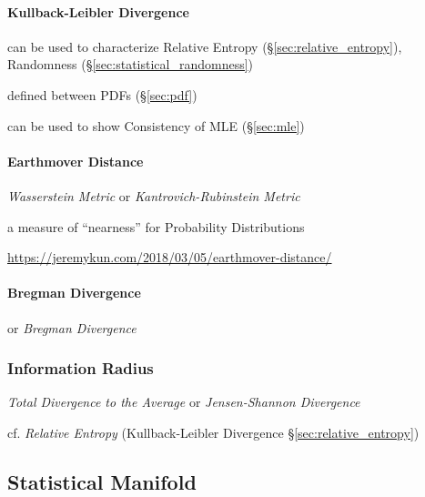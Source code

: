 \paragraph{Kullback-Leibler Divergence}\label{sec:kullback_leibler}\hfill

can be used to characterize Relative Entropy (\S\ref{sec:relative_entropy}),
Randomness (\S\ref{sec:statistical_randomness})

defined between PDFs (\S\ref{sec:pdf})

can be used to show Consistency of MLE (\S\ref{sec:mle})



\paragraph{Earthmover Distance}\label{sec:earthmover_distance}\hfill

\emph{Wasserstein Metric} or \emph{Kantrovich-Rubinstein Metric}

a measure of ``nearness'' for Probability Distributions

\url{https://jeremykun.com/2018/03/05/earthmover-distance/}



\paragraph{Bregman Divergence}\label{sec:bregman_divergence}\hfill

or \emph{Bregman Divergence}



\subsubsection{Information Radius}\label{sec:information_radius}

\emph{Total Divergence to the Average} or \emph{Jensen-Shannon Divergence}

cf. \emph{Relative Entropy} (Kullback-Leibler Divergence
\S\ref{sec:relative_entropy})



\subsection{Statistical Manifold}\label{sec:statistical_manifold}

